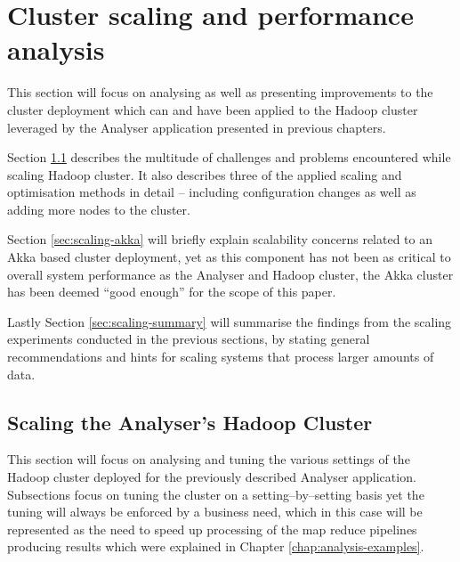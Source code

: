 \chapter{Cluster scaling and performance analysis}
\label{chap:perf-scalability}

This section will focus on analysing as well as presenting improvements to the cluster deployment which can and have been applied to the Hadoop cluster leveraged by the Analyser application presented in previous chapters.

Section \ref{sec:scaling-hadoop} describes the multitude of challenges and problems encountered while scaling Hadoop cluster. It also describes three of the applied scaling and optimisation methods in detail -- including configuration changes as well as adding more nodes to the cluster.


Section \ref{sec:scaling-akka} will briefly explain scalability concerns related to an Akka based cluster deployment, yet as this component has not been as critical to overall system performance as the Analyser and Hadoop cluster, the Akka cluster has been deemed ``good enough'' for the scope of this paper.

Lastly Section \ref{sec:scaling-summary} will summarise the findings from the scaling experiments conducted in the previous sections, by stating general recommendations and hints for scaling systems that process larger amounts of data.

\section{Scaling the Analyser's Hadoop Cluster}
\label{sec:scaling-hadoop}
This section will focus on analysing and tuning the various settings of the Hadoop cluster deployed for the previously described Analyser application. Subsections focus on tuning the cluster on a setting--by--setting basis yet the tuning will always be enforced by a business need, which in this case will be represented as the need to speed up processing of the map reduce pipelines producing results which were explained in Chapter \ref{chap:analysis-examples}.

